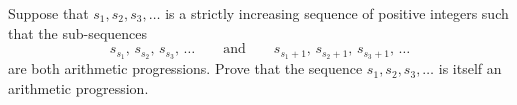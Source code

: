 Suppose that $ s_1,s_2,s_3, \ldots$ is a strictly increasing sequence of positive integers such that the sub-sequences \[s_{s_1},\, s_{s_2},\, s_{s_3},\, \ldots\qquad\text{and}\qquad s_{s_1+1},\, s_{s_2+1},\, s_{s_3+1},\, \ldots\] are both arithmetic progressions. Prove that the sequence $ s_1, s_2, s_3, \ldots$ is itself an arithmetic progression.